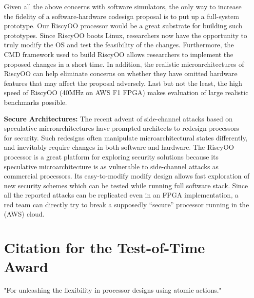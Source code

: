 \documentclass[conference]{IEEEtran}
\begin{document}
Given all the above concerns with software simulators, the only way to increase the fidelity of a software-hardware codesign proposal is to put up a full-system prototype.
Our RiscyOO processor would be a great substrate for building such prototypes.
Since RiscyOO boots Linux, researchers now have the opportunity to truly modify the OS and test the feasibility of the changes.
Furthermore, the CMD framework used to build RiscyOO allows researchers to implement the proposed changes in a short time.
In addition, the realistic microarchitectures of RiscyOO can help eliminate concerns on whether they have omitted hardware features that may affect the proposal adversely.
Last but not the least, the high speed of RiscyOO (40MHz on AWS F1 FPGA) makes evaluation of large realistic benchmarks possible.

\noindent\textbf{Secure Architectures:}
The recent advent of side-channel attacks based on speculative microarchitectures have prompted architects to redesign processors for security.
Such redesigns often manipulate microarchitectural states differently, and inevitably require changes in both software and hardware.
The RiscyOO processor is a great platform for exploring security solutions because its speculative microarchitecture is as vulnerable to side-channel attacks as commercial processors.
Its easy-to-modify modify design allows fast exploration of new security schemes which can be tested while running full software stack.
Since all the reported attacks can be replicated even in an FPGA implementation, a red team can directly try to break a supposedly ``secure'' processor running in the (AWS) cloud. 

\section{Citation for the Test-of-Time Award}
"For unleashing the flexibility in processor designs using atomic actions."



\end{document}
